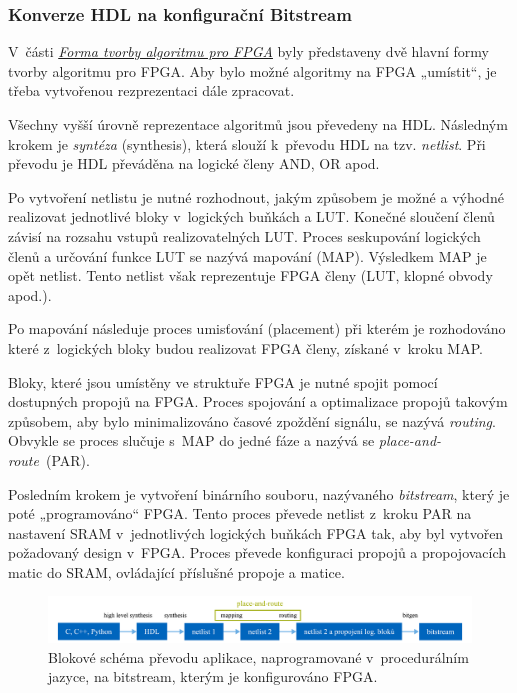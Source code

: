 \documentclass[a4paper, twoside, 11pt]{article}
\begin{document}
		\subsubsection{Konverze HDL na konfigurační Bitstream}
			V~části \hyperref[subsubsec:forma-tvorby-algoritmu-pro-fpga]{\textit{Forma tvorby algoritmu pro FPGA}} byly představeny dvě hlavní formy tvorby algoritmu pro FPGA. Aby bylo možné algoritmy na FPGA „umístit“, je třeba vytvořenou rezprezentaci dále zpracovat.\par
			Všechny vyšší úrovně reprezentace algoritmů jsou převedeny na HDL. Následným krokem je \textit{syntéza} (synthesis), která slouží k~převodu HDL na tzv. \textit{netlist}. Při převodu je HDL převáděna na logické členy AND, OR apod. \cite{Sass2010}\par
			Po vytvoření netlistu je nutné rozhodnout, jakým způsobem je možné a výhodné realizovat jednotlivé bloky v~logických buňkách a LUT. Konečné sloučení členů závisí na rozsahu vstupů realizovatelných LUT. Proces seskupování logických členů a určování funkce LUT se nazývá mapování (MAP). Výsledkem MAP je opět netlist. Tento netlist však reprezentuje FPGA členy (LUT, klopné obvody apod.). \cite{Sass2010}\par
			Po mapování následuje proces umisťování (placement) při kterém je rozhodováno které z~logických bloky budou realizovat FPGA členy, získané v~kroku MAP. \cite{Sass2010}\par
			Bloky, které jsou umístěny ve struktuře FPGA je nutné spojit pomocí dostupných propojů na FPGA. Proces spojování a optimalizace propojů takovým způsobem, aby bylo minimalizováno časové zpoždění signálu, se nazývá \textit{routing}. Obvykle se proces slučuje s~MAP do jedné fáze a nazývá se \textit{place-and-route}~(PAR). \cite{Sass2010} \par
			Posledním krokem je vytvoření binárního souboru, nazývaného \textit{bitstream}, který je poté „programováno“ FPGA. Tento proces převede netlist z~kroku PAR na nastavení SRAM v~jednotlivých logických buňkách FPGA tak, aby byl vytvořen požadovaný design v~FPGA. Proces převede konfiguraci propojů a propojovacích matic do SRAM, ovládající příslušné propoje a matice. \cite{Sass2010}\par

			
			\begin{figure}[htbp!]
				\centering
					\includegraphics[width=1\textwidth]{src/pdf/fpga-hls-to-bitstream-flow-chart.pdf} 
					\caption{Blokové schéma převodu aplikace, naprogramované v~procedurálním jazyce, na bitstream, kterým je konfigurováno FPGA.}
					\label{fig:fpga-hls-to-bitstream-flow-chart}
			\end{figure}
\end{document}
